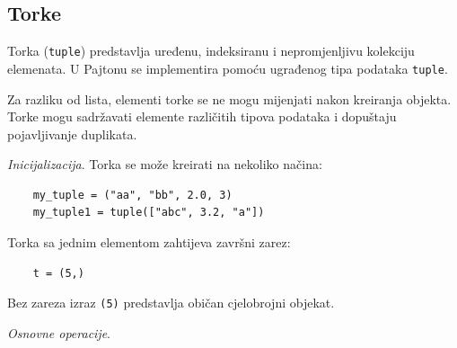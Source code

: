 \subsection{Torke}

Torka (\texttt{tuple}) predstavlja uređenu, indeksiranu i nepromjenljivu  kolekciju elemenata. U Pajtonu se implementira pomoću ugrađenog tipa podataka \texttt{tuple}.

Za razliku od lista, elementi torke se ne mogu mijenjati nakon kreiranja objekta. Torke mogu sadržavati elemente različitih tipova podataka i dopuštaju pojavljivanje duplikata.

\textit{Inicijalizacija}. Torka se može kreirati na nekoliko načina:

\begin{verbatim}
	my_tuple = ("aa", "bb", 2.0, 3)
	my_tuple1 = tuple(["abc", 3.2, "a"])
\end{verbatim}

Torka sa jednim elementom zahtijeva završni zarez:

\begin{verbatim}
	t = (5,)
\end{verbatim}

Bez zareza izraz \texttt{(5)} predstavlja običan cjelobrojni objekat.

\textit{Osnovne operacije}. 

